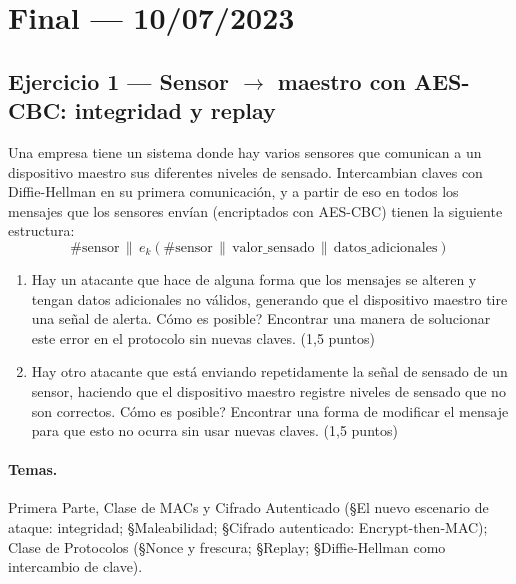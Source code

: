 \section{Final --- 10/07/2023}

\subsection{Ejercicio 1 --- Sensor $\to$ maestro con AES-CBC: integridad y replay}

\begin{consigna}
Una empresa tiene un sistema donde hay varios sensores que comunican a un dispositivo
maestro sus diferentes niveles de sensado. Intercambian claves con Diffie-Hellman en su
primera comunicación, y a partir de eso en todos los mensajes que los sensores envían
(encriptados con AES-CBC) tienen la siguiente estructura:
\begin{equation*}
\#\text{sensor} \,\|\, e_k(\#\text{sensor} \,\|\, \text{valor\_sensado} \,\|\, \text{datos\_adicionales})
\end{equation*}
\begin{enumerate}
  \item[1.] Hay un atacante que hace de alguna forma que los mensajes se alteren y
  tengan datos adicionales no válidos, generando que el dispositivo maestro tire una
  señal de alerta. \textquestiondown{}Cómo es posible? Encontrar una manera de solucionar este error en
  el protocolo sin nuevas claves. (1,5 puntos)
  \item[2.] Hay otro atacante que está enviando repetidamente la señal de sensado de un
  sensor, haciendo que el dispositivo maestro registre niveles de sensado que no son
  correctos. \textquestiondown{}Cómo es posible? Encontrar una forma de modificar el mensaje para que
  esto no ocurra sin usar nuevas claves. (1,5 puntos)
\end{enumerate}
\end{consigna}

\paragraph{Temas.}
Primera Parte, Clase de MACs y Cifrado Autenticado (\S El nuevo escenario de ataque:
integridad; \S Maleabilidad; \S Cifrado autenticado: Encrypt-then-MAC); Clase de
Protocolos (\S Nonce y frescura; \S Replay; \S Diffie-Hellman como intercambio de clave).

